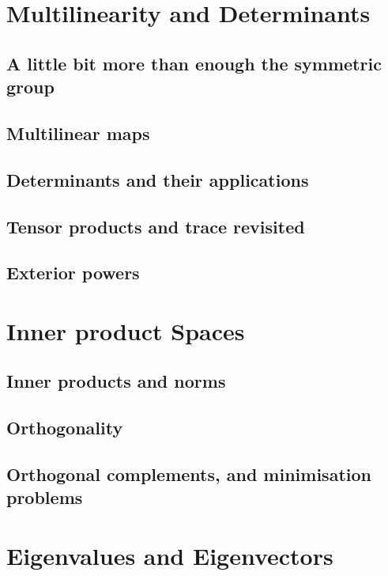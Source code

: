 \documentclass{book}
\theoremstyle{plain}
\theoremstyle{definition}
\theoremstyle{remark}
\begin{document}
\chapter{Multilinearity and Determinants}

\section{A little bit more than enough the symmetric group}

\section{Multilinear maps}

\section{Determinants and their applications}

\section{Tensor products and trace revisited}

\section{Exterior powers}

\chapter{Inner product Spaces}

\section{Inner products and norms}

\section{Orthogonality}

\section{Orthogonal complements, and minimisation problems}

\chapter{Eigenvalues and Eigenvectors}
\end{document}

